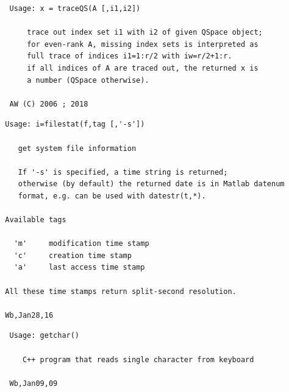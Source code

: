 \documentclass[twoside,12pt]{article}
\begin{document}
\pagebreak[3]



\begin{verbatim}
   Usage: x = traceQS(A [,i1,i2])
 
       trace out index set i1 with i2 of given QSpace object;
       for even-rank A, missing index sets is interpreted as
       full trace of indices i1=1:r/2 with iw=r/2+1:r.
       if all indices of A are traced out, the returned x is
       a number (QSpace otherwise).
 
   AW (C) 2006 ; 2018
\end{verbatim}



\pagebreak[3]



\begin{verbatim}
  Usage: i=filestat(f,tag [,'-s'])
 
     get system file information
 
     If '-s' is specified, a time string is returned;
     otherwise (by default) the returned date is in Matlab datenum
     format, e.g. can be used with datestr(t,*).
 
  Available tags
 
    'm'     modification time stamp
    'c'     creation time stamp
    'a'     last access time stamp
 
  All these time stamps return split-second resolution.
 
  Wb,Jan28,16
\end{verbatim}

\pagebreak[3]



\begin{verbatim}
   Usage: getchar()
 
      C++ program that reads single character from keyboard
 
   Wb,Jan09,09
\end{verbatim}

\pagebreak[3]


\end{document}
